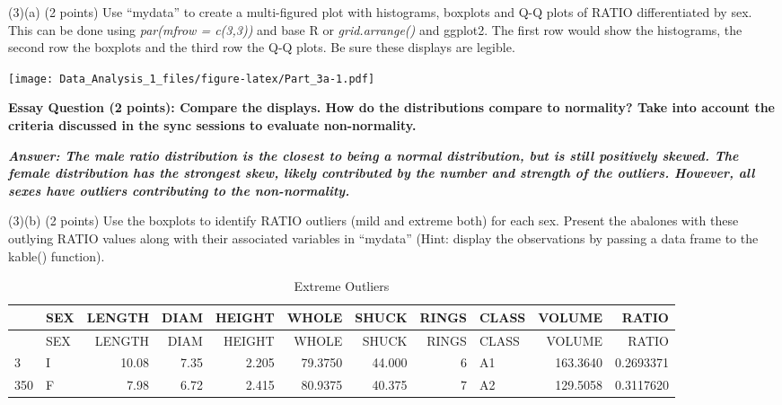 \documentclass[
]{article}
\begin{document}
(3)(a) (2 points) Use ``mydata'' to create a multi-figured plot with
histograms, boxplots and Q-Q plots of RATIO differentiated by sex. This
can be done using \emph{par(mfrow = c(3,3))} and base R or
\emph{grid.arrange()} and ggplot2. The first row would show the
histograms, the second row the boxplots and the third row the Q-Q plots.
Be sure these displays are legible.

\texttt{[image: Data\_Analysis\_1\_files/figure-latex/Part\_3a-1.pdf]}

\textbf{Essay Question (2 points): Compare the displays. How do the
distributions compare to normality? Take into account the criteria
discussed in the sync sessions to evaluate non-normality.}

\textbf{\emph{Answer: The male ratio distribution is the closest to
being a normal distribution, but is still positively skewed. The female
distribution has the strongest skew, likely contributed by the number
and strength of the outliers. However, all sexes have outliers
contributing to the non-normality.}}

(3)(b) (2 points) Use the boxplots to identify RATIO outliers (mild and
extreme both) for each sex. Present the abalones with these outlying
RATIO values along with their associated variables in ``mydata'' (Hint:
display the observations by passing a data frame to the kable()
function).

\begin{longtable}[]{@{}llrrrrrrlrr@{}}
\caption{Extreme Outliers}\tabularnewline
\toprule
& SEX & LENGTH & DIAM & HEIGHT & WHOLE & SHUCK & RINGS & CLASS & VOLUME
& RATIO\tabularnewline
\midrule
\endfirsthead
\toprule
& SEX & LENGTH & DIAM & HEIGHT & WHOLE & SHUCK & RINGS & CLASS & VOLUME
& RATIO\tabularnewline
\midrule
\endhead
3 & I & 10.08 & 7.35 & 2.205 & 79.3750 & 44.000 & 6 & A1 & 163.3640 &
0.2693371\tabularnewline
350 & F & 7.98 & 6.72 & 2.415 & 80.9375 & 40.375 & 7 & A2 & 129.5058 &
0.3117620\tabularnewline
\bottomrule
\end{longtable}
\end{document}
